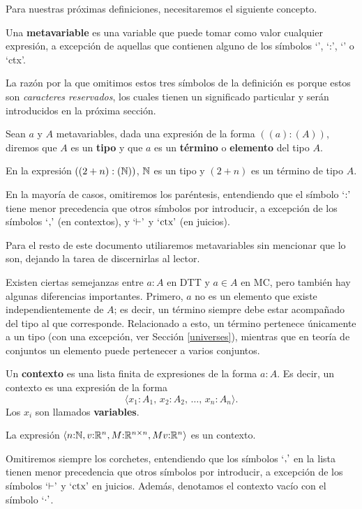 \documentclass[../main.tex]{subfiles}
\begin{document}
Para nuestras pr\'oximas definiciones, necesitaremos el siguiente concepto.

\begin{definition}
    Una \textbf{metavariable} es una variable que puede tomar como valor cualquier expresi\'on, a excepción de aquellas que contienen alguno de los s\'imbolos `\equiv', `:', `\vdash' o `ctx'.
\end{definition}

La raz\'on por la que omitimos estos tres s\'imbolos de la definici\'on es porque estos son \textit{caracteres reservados}, los cuales tienen un significado particular y ser\'an introducidos en la pr\'oxima secci\'on.

\begin{definition}
    Sean $a$ y $A$ metavariables, dada una expresión de la forma
    $((a):(A))$, diremos que $A$ es un \textbf{tipo} y que $a$ es un \textbf{término} o \textbf{elemento} del tipo $A$.
\end{definition}
\begin{example}
    En la expresión $((2+n):(\mathbb{N}))$, $\mathbb{N}$ es un tipo y $(2+n)$ es un término de tipo $A$.
\end{example}
\begin{notation}
    En la mayoría de casos, omitiremos los paréntesis, entendiendo que el símbolo `${:}\textrm'$ tiene menor precedencia que otros símbolos por introducir, a excepción de los símbolos `${,}\textrm'$ (en contextos), y `${\vdash}\textrm'$ y  `${\textnormal{ctx}}\textrm'$ (en juicios).
\end{notation}

Para el resto de este documento utiliaremos metavariables sin mencionar que lo son, dejando la tarea de discernirlas al lector.

Existen ciertas semejanzas entre $a:A$ en DTT y $a \in A$ en MC, pero también hay algunas diferencias importantes.
Primero, $a$ no es un elemento que existe independientemente de $A$; es decir, un término siempre debe estar acompañado del tipo al que corresponde.
Relacionado a esto, un término pertenece únicamente a un tipo (con una excepción, ver Sección \ref{universes}), mientras que en teoría de conjuntos un elemento puede pertenecer a varios conjuntos.

\begin{definition}
    Un \textbf{contexto} es una lista finita de expresiones de la forma $a:A$. Es decir, un contexto es una expresión de la forma
    $$\langle x_1{:}A_1, \, x_2{:}A_2, \, \dots, \, x_n{:}A_n\rangle.$$
    Los $x_i$ son llamados \textbf{variables}.
\end{definition}
\begin{example}
    La expresión $\langle n{:}\mathbb{N},v{:}\mathbb{R}^n,M{:}\mathbb{R}^{n\times n}, Mv{:}\mathbb{R}^n \rangle$ es un contexto.
\end{example}
\begin{notation}
    Omitiremos siempre los corchetes, entendiendo que los símbolos `${,}\textrm'$ en la lista tienen menor precedencia que otros símbolos por introducir, a excepción de los símbolos `${\vdash}\textrm'$ y  `${\textnormal{ctx}}\textrm'$ en juicios. Además, denotamos el contexto vac\'io con el símbolo `${\cdot}\textrm'$.
\end{notation}
\end{document}
